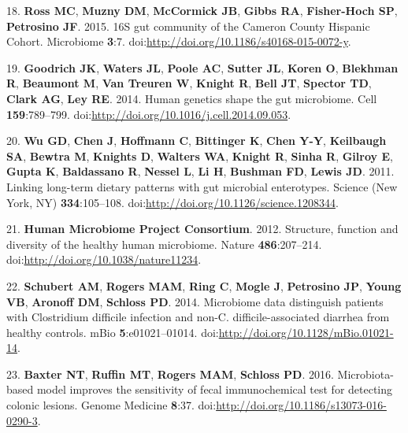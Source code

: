 \documentclass[12pt,]{article}
\begin{document}
18. \textbf{Ross MC}, \textbf{Muzny DM}, \textbf{McCormick JB},
\textbf{Gibbs RA}, \textbf{Fisher-Hoch SP}, \textbf{Petrosino JF}. 2015.
16S gut community of the Cameron County Hispanic Cohort. Microbiome
\textbf{3}:7. doi:\url{http://doi.org/10.1186/s40168-015-0072-y}.

19. \textbf{Goodrich JK}, \textbf{Waters JL}, \textbf{Poole AC},
\textbf{Sutter JL}, \textbf{Koren O}, \textbf{Blekhman R},
\textbf{Beaumont M}, \textbf{Van Treuren W}, \textbf{Knight R},
\textbf{Bell JT}, \textbf{Spector TD}, \textbf{Clark AG}, \textbf{Ley
RE}. 2014. Human genetics shape the gut microbiome. Cell
\textbf{159}:789--799.
doi:\url{http://doi.org/10.1016/j.cell.2014.09.053}.

20. \textbf{Wu GD}, \textbf{Chen J}, \textbf{Hoffmann C},
\textbf{Bittinger K}, \textbf{Chen Y-Y}, \textbf{Keilbaugh SA},
\textbf{Bewtra M}, \textbf{Knights D}, \textbf{Walters WA},
\textbf{Knight R}, \textbf{Sinha R}, \textbf{Gilroy E}, \textbf{Gupta
K}, \textbf{Baldassano R}, \textbf{Nessel L}, \textbf{Li H},
\textbf{Bushman FD}, \textbf{Lewis JD}. 2011. Linking long-term dietary
patterns with gut microbial enterotypes. Science (New York, NY)
\textbf{334}:105--108. doi:\url{http://doi.org/10.1126/science.1208344}.

21. \textbf{Human Microbiome Project Consortium}. 2012. Structure,
function and diversity of the healthy human microbiome. Nature
\textbf{486}:207--214. doi:\url{http://doi.org/10.1038/nature11234}.

22. \textbf{Schubert AM}, \textbf{Rogers MAM}, \textbf{Ring C},
\textbf{Mogle J}, \textbf{Petrosino JP}, \textbf{Young VB},
\textbf{Aronoff DM}, \textbf{Schloss PD}. 2014. Microbiome data
distinguish patients with Clostridium difficile infection and non-C.
difficile-associated diarrhea from healthy controls. mBio
\textbf{5}:e01021--01014.
doi:\url{http://doi.org/10.1128/mBio.01021-14}.

23. \textbf{Baxter NT}, \textbf{Ruffin MT}, \textbf{Rogers MAM},
\textbf{Schloss PD}. 2016. Microbiota-based model improves the
sensitivity of fecal immunochemical test for detecting colonic lesions.
Genome Medicine \textbf{8}:37.
doi:\url{http://doi.org/10.1186/s13073-016-0290-3}.
\end{document}
